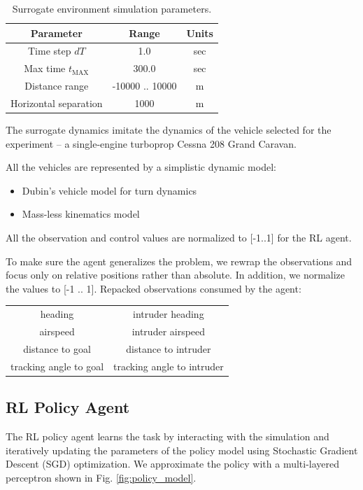\begin{table}[h]
	\centering
	\begin{tabular}{||c | c | c||} 
		\hline
		Parameter & Range & Units \\
		\hline
		Time step $dT$ & 1.0  & sec \\
		Max time $t_\text{MAX}$ & 300.0  & sec \\
		Distance range & -10000 .. 10000  & m \\
		Horizontal separation & 1000  & m \\
		\hline
	\end{tabular}
	\caption{Surrogate environment simulation parameters.}
	\label{tbl:sim_param}
\end{table}


The surrogate dynamics imitate the dynamics of the vehicle selected for the experiment -- a single-engine turboprop Cessna 208 Grand Caravan.

All the vehicles are represented by a simplistic dynamic model:
\begin{itemize}
	\item Dubin's vehicle model for turn dynamics
	\item Mass-less kinematics model 
	\end {itemize}
	
	
	All the observation and control values are normalized to [-1..1] for the RL agent.
	
	To make sure the agent generalizes the problem, we rewrap the observations and focus only on relative positions rather than absolute. In addition, we normalize the values to [-1 .. 1].
	Repacked observations consumed by the agent:
	\begin{center}
		\begin{tabular}{|| c | c ||} 
			\hline
			heading & intruder heading\\
			airspeed & intruder airspeed\\
			distance to goal & distance to intruder\\
			tracking angle to goal & tracking angle to intruder\\
			\hline
		\end{tabular}
	\end{center}

\subsection{RL Policy Agent}

The RL policy agent learns the task by interacting with the simulation and iteratively updating the parameters of the policy model using Stochastic Gradient Descent (SGD) optimization. We approximate the policy with a multi-layered perceptron shown in Fig. \ref{fig:policy_model}.

